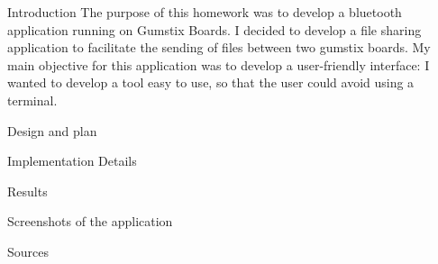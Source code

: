 Introduction
The purpose of this homework was to develop a bluetooth application running on Gumstix Boards. I decided to develop a file sharing application to facilitate the sending of files between two gumstix boards.
My main objective for this application was to develop a user-friendly interface: I wanted to develop a tool easy to use, so that the user could avoid using a terminal. 
 
Design and plan

Implementation Details

Results

Screenshots of the application

Sources
